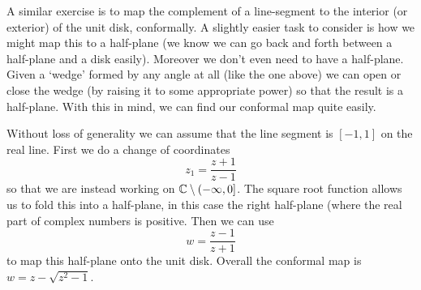 A similar exercise is to map the complement of a line-segment to the interior (or exterior) of the unit disk, conformally. A slightly easier task to consider is how we might map this to a half-plane (we know we can go back and forth between a half-plane and a disk easily). Moreover we don't even need to have a half-plane. Given a `wedge' formed by any angle at all (like the one above) we can open or close the wedge (by raising it to some appropriate power) so that the result is a half-plane. With this in mind, we can find our conformal map quite easily.

Without loss of generality we can assume that the line segment is $[-1, 1]$ on the real line. First we do a change of coordinates
$$ z_1 = \frac{z + 1}{z - 1} $$
so that we are instead working on $\mathbb{C} \setminus (-\infty, 0]$. The square root function allows us to fold this into a half-plane, in this case the right half-plane (where the real part of complex numbers is positive. Then we can use
$$ w = \frac{z - 1}{z + 1} $$
to map this half-plane onto the unit disk. Overall the conformal map is $w = z - \sqrt{z^2 - 1}$.